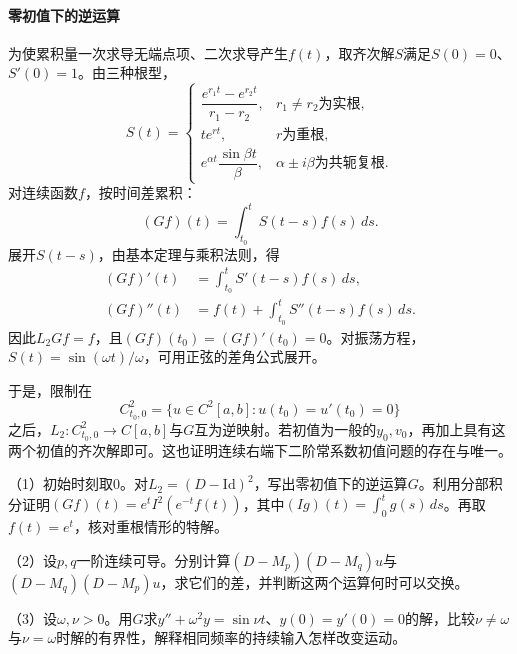 \paragraph{零初值下的逆运算} \mbox{}

\begingroup
\setlength{\abovedisplayskip}{7pt}
\setlength{\belowdisplayskip}{7pt}
\setlength{\jot}{1pt}
为使累积量一次求导无端点项、二次求导产生\(f(t)\)，取齐次解\(S\)满足\(S(0)=0\)、\(S'(0)=1\)。由三种根型，
\begin{equation*}
 S(t)=\begin{cases}
 \dfrac{e^{r_1t}-e^{r_2t}}{r_1-r_2},&r_1\ne r_2\text{为实根},\\[3pt]
 te^{rt},&r\text{为重根},\\[2pt]
 e^{\alpha t}\dfrac{\sin\beta t}{\beta},&\alpha\pm i\beta\text{为共轭复根}.
 \end{cases}
\end{equation*}
对连续函数\(f\)，按时间差累积：
\begin{equation*}
 (Gf)(t)=\int_{t_0}^t S(t-s)f(s)\,ds.
\end{equation*}
展开\(S(t-s)\)，由基本定理与乘积法则，得
\begin{equation*}
 \begin{aligned}
 (Gf)'(t)&=\int_{t_0}^t S'(t-s)f(s)\,ds,\\
 (Gf)''(t)&=f(t)+\int_{t_0}^t S''(t-s)f(s)\,ds.
 \end{aligned}
\end{equation*}
\endgroup
因此\(L_2Gf=f\)，且\((Gf)(t_0)=(Gf)'(t_0)=0\)。对振荡方程，\(S(t)=\sin(\omega t)/\omega\)，可用正弦的差角公式展开。

于是，限制在
\begin{equation*}
 C^2_{t_0,0}=\{u\in C^2[a,b]:u(t_0)=u'(t_0)=0\}
\end{equation*}
之后，\(L_2:C^2_{t_0,0}\to C[a,b]\)与\(G\)互为逆映射。若初值为一般的\(y_0,v_0\)，再加上具有这两个初值的齐次解即可。这也证明连续右端下二阶常系数初值问题的存在与唯一。

\begin{exercise}
\mbox{}\par\nobreak

（1）初始时刻取\(0\)。对\(L_2=(D-\mathrm{Id})^2\)，写出零初值下的逆运算\(G\)。利用分部积分证明\((Gf)(t)=e^tI^2(e^{-t}f(t))\)，其中\((Ig)(t)=\int_0^t g(s)\,ds\)。再取\(f(t)=e^t\)，核对重根情形的特解。

（2）设\(p,q\)一阶连续可导。分别计算\((D-M_p)(D-M_q)u\)与\((D-M_q)(D-M_p)u\)，求它们的差，并判断这两个运算何时可以交换。

（3）设\(\omega,\nu>0\)。用\(G\)求\(y''+\omega^2y=\sin\nu t\)、\(y(0)=y'(0)=0\)的解，比较\(\nu\ne\omega\)与\(\nu=\omega\)时解的有界性，解释相同频率的持续输入怎样改变运动。
\end{exercise}

